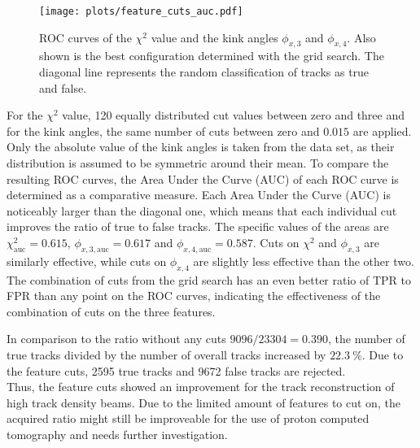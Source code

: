 \begin{figure}[H]
  \centering
  \texttt{[image: plots/feature\_cuts\_auc.pdf]}
  \caption{ROC curves of the $\chi^2$ value and the kink angles $\phi_{x,3}$ and $\phi_{x,4}$. Also shown is the best configuration determined with the grid search. The diagonal
  line represents the random classification of tracks as true and false.}
  \label{fig:feature_grid}
\end{figure}

For the $\chi^2$ value, 120 equally distributed cut values between zero and three and for the kink angles, the same number of cuts between
zero and $0.015$ are applied. Only the absolute value of the
kink angles is taken from the data set, as their distribution is assumed to be symmetric around their mean. To compare the resulting ROC curves, the Area Under the Curve (AUC)
of each ROC curve is determined as a comparative measure.
Each Area Under the Curve (AUC) is noticeably larger than the diagonal
one, which means that each individual cut improves the ratio of true to false tracks. The specific values of the areas are $\chi^2_{\text{auc}} = 0.615$,
$\phi_{x,3,\text{auc}} = 0.617$ and $\phi_{x,4,\text{auc}} = 0.587$. Cuts on $\chi^2$ and $\phi_{x,3}$ are similarly effective, while cuts on $\phi_{x,4}$ are slightly
less effective than the other two. The combination of cuts from the grid search has an even better ratio of TPR to FPR than any point on the ROC curves, indicating the
effectiveness of the combination of cuts on the three features.

In comparison to the ratio without any cuts $9096/23304 = 0.390$, the number of true tracks divided by the number of overall tracks increased by $\SI{22.3}{\percent}$. Due to
the feature cuts, 2595 true tracks and 9672 false tracks are rejected. \\
Thus, the feature cuts showed an improvement for the track reconstruction of high track density beams. Due to the limited amount of features to cut on, the acquired ratio
might still be improveable for the use of proton computed tomography and needs further investigation.
